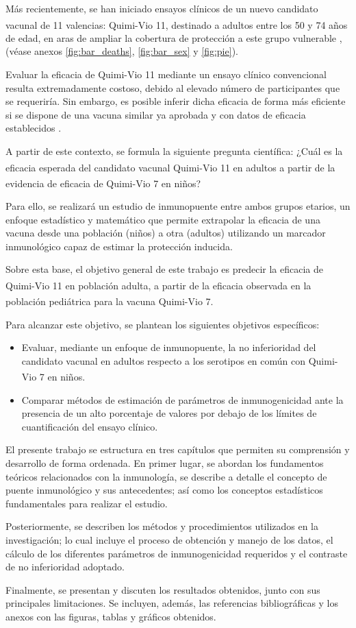 Más recientemente, se han iniciado ensayos clínicos de un nuevo candidato vacunal de 11 valencias: Quimi-Vio\textsuperscript{\textregistered} 11, destinado a adultos entre los 50 y 74 años de edad, en aras de ampliar la cobertura de protección a este grupo vulnerable \cite{prensa2025neumo11}, (véase anexos \ref{fig:bar_deaths}, \ref{fig:bar_sex} y \ref{fig:pie}). 

Evaluar la eficacia de Quimi-Vio 11 mediante un ensayo clínico convencional resulta extremadamente costoso, debido al elevado número de participantes que se requeriría. Sin embargo, es posible inferir dicha eficacia de forma más eficiente si se dispone de una vacuna similar ya aprobada y con datos de eficacia establecidos \cite{cruz2025}. 

A partir de este contexto, se formula la siguiente pregunta científica: ¿Cuál es la eficacia esperada del candidato vacunal Quimi-Vio\textsuperscript{\textregistered} 11 en adultos a partir de la evidencia de eficacia de Quimi-Vio\textsuperscript{\textregistered} 7 en niños? 

Para ello, se realizará un estudio de inmunopuente entre ambos grupos etarios, un enfoque estadístico y matemático que permite extrapolar la eficacia de una vacuna desde una población (niños) a otra (adultos) utilizando un marcador inmunológico capaz de estimar la protección inducida. 

Sobre esta base, el objetivo general de este trabajo es predecir la eficacia de Quimi-Vio\textsuperscript{\textregistered} 11 en población adulta, a partir de la eficacia observada en la población pediátrica para la vacuna Quimi-Vio\textsuperscript{\textregistered} 7.

Para alcanzar este objetivo, se plantean los siguientes objetivos específicos:
\begin{itemize} 
	\item Evaluar, mediante un enfoque de inmunopuente, la no inferioridad del candidato vacunal en adultos respecto a los serotipos en común con Quimi-Vio\textsuperscript{\textregistered} 7 en niños.
	\item Comparar métodos de estimación de parámetros de inmunogenicidad ante la presencia de un alto porcentaje de valores por debajo de los límites de cuantificación del ensayo clínico.
\end{itemize}

El presente trabajo se estructura en tres capítulos que permiten su comprensión y desarrollo de forma ordenada. En primer lugar, se abordan los fundamentos teóricos relacionados con la inmunología, se describe a detalle el concepto de puente inmunológico y sus antecedentes; así como los conceptos estadísticos fundamentales para realizar el estudio.

Posteriormente, se describen los métodos y procedimientos utilizados en la investigación; lo cual incluye el proceso de obtención y manejo de los datos, el cálculo de los diferentes parámetros de inmunogenicidad requeridos y el contraste de no inferioridad adoptado.

Finalmente, se presentan y discuten los resultados obtenidos, junto con sus principales limitaciones. Se incluyen, además, las referencias bibliográficas y los anexos con las figuras, tablas y gráficos obtenidos.
